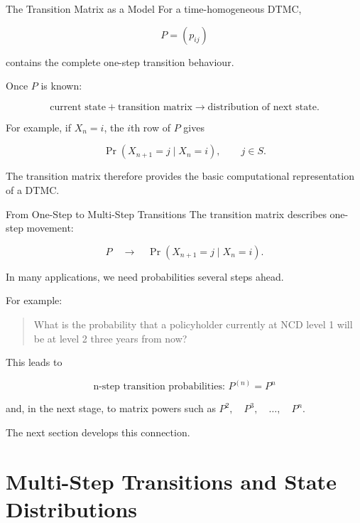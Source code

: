 \documentclass[
  ignorenonframetext,
  aspectratio=169,
]{beamer}
\begin{document}
\begin{frame}{The Transition Matrix as a Model}
\protect{}\label{the-transition-matrix-as-a-model}
For a time-homogeneous DTMC,

\[
P=(p_{ij})
\]

contains the complete one-step transition behaviour.

Once \(P\) is known:

\[
\boxed{
\text{current state}
+
\text{transition matrix}
\longrightarrow
\text{distribution of next state}.
}
\]

For example, if \(X_n=i\), the \(i\)th row of \(P\) gives

\[
\Pr(X_{n+1}=j\mid X_n=i),
\qquad j\in S.
\]

The transition matrix therefore provides the basic computational
representation of a DTMC.
\end{frame}

\begin{frame}{From One-Step to Multi-Step Transitions}
\protect{}\label{from-one-step-to-multi-step-transitions}
The transition matrix describes one-step movement:

\[
P
\quad\longrightarrow\quad
\Pr(X_{n+1}=j\mid X_n=i).
\]

In many applications, we need probabilities several steps ahead.

For example:

\begin{quote}
What is the probability that a policyholder currently at NCD level 1
will be at level 2 three years from now?
\end{quote}

This leads to

\[
\boxed{\text{n-step transition probabilities: } P^{(n)} = P^n}
\]

and, in the next stage, to matrix powers such as
\(P^2,\quad P^3,\quad\ldots,\quad P^n.\)

The next section develops this connection.
\end{frame}

\section{Multi-Step Transitions and State
Distributions}\label{multi-step-transitions-and-state-distributions}
\end{document}

